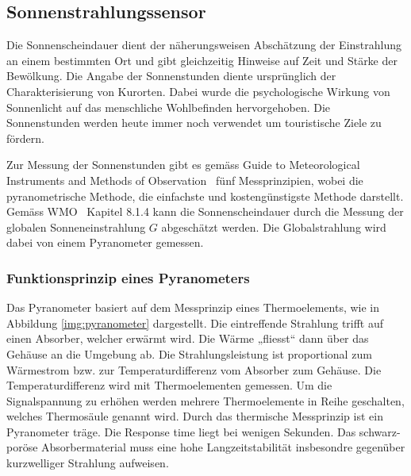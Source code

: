 \subsection{Sonnenstrahlungssensor}
Die Sonnenscheindauer dient der näherungsweisen Abschätzung der Einstrahlung an einem bestimmten Ort und gibt gleichzeitig Hinweise auf Zeit und Stärke der Bewölkung. Die Angabe der Sonnenstunden diente ursprünglich der Charakterisierung von Kurorten. Dabei wurde die psychologische Wirkung von Sonnenlicht auf das menschliche Wohlbefinden hervorgehoben. Die Sonnenstunden werden heute immer noch verwendet um touristische Ziele zu fördern.

\noindent
Zur Messung der Sonnenstunden gibt es gemäss  \flqq Guide to Meteorological Instruments and Methods of Observation\frqq ~\cite{WMO2014Gtmi}  fünf Messprinzipien, wobei die pyranometrische Methode, die einfachste und kostengünstigste Methode darstellt. Gemäss WMO~\cite{WMO2014Gtmi} Kapitel 8.1.4 kann die Sonnenscheindauer durch die Messung der globalen Sonneneinstrahlung $G$ abgeschätzt werden. Die Globalstrahlung wird dabei von einem Pyranometer gemessen.

\subsubsection{Funktionsprinzip eines Pyranometers}
Das Pyranometer basiert auf dem Messprinzip eines Thermoelements, wie in Abbildung \ref{img:pyranometer}  dargestellt. Die eintreffende Strahlung trifft auf einen Absorber, welcher erwärmt wird. Die Wärme „fliesst“ dann über das Gehäuse an die Umgebung ab. Die Strahlungsleistung ist proportional zum Wärmestrom bzw. zur Temperaturdifferenz vom Absorber zum Gehäuse. Die Temperaturdifferenz wird mit Thermoelementen gemessen. Um die Signalspannung zu erhöhen werden mehrere Thermoelemente in Reihe geschalten, welches Thermosäule genannt wird. Durch das thermische Messprinzip ist ein Pyranometer träge. Die Response time liegt bei wenigen Sekunden. Das schwarz-poröse Absorbermaterial muss eine hohe Langzeitstabilität insbesondre gegenüber kurzwelliger Strahlung aufweisen.

